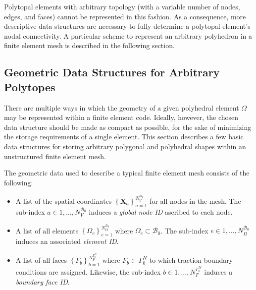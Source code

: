 	Polytopal elements with arbitrary topology (with a variable number of nodes, edges, and faces) cannot be represented in this fashion. As a consequence, more descriptive data structures are necessary to fully determine a polytopal element's nodal connectivity. A particular scheme to represent an arbitrary polyhedron in a finite element mesh is described in the following section.

\subsection*{Geometric Data Structures for Arbitrary Polytopes}

	There are multiple ways in which the geometry of a given polyhedral element $\Omega$ may be represented within a finite element code. Ideally, however, the chosen data structure should be made as compact as possible, for the sake of minimizing the storage requirements of a single element. This section describes a few basic data structures for storing arbitrary polygonal and polyhedral shapes within an unstructured finite element mesh.
	
	The geometric data used to describe a typical finite element mesh consists of the following:
	\begin{itemize}
		\item A list of the spatial coordinates $\left\{ \mathbf{X}_a \right\}_{a=1}^{N^{\mathcal{B}_0}_V}$ for all nodes in the mesh. The sub-index $a \in 1, \ldots, N^{\mathcal{B}_0}_V$ induces a \textit{global node ID} ascribed to each node.
		\item A list of all elements $\left\{ \Omega_{e} \right\}_{e = 1}^{N^{\mathcal{B}_0}_\Omega}$ where $\Omega_{e} \subset \mathcal{B}_0$. The sub-index $e \in 1, \ldots, N^{\mathcal{B}_0}_\Omega$ induces an associated \textit{element ID}.
		\item A list of all faces $\left\{ F_{b} \right\}_{b = 1}^{N^{\Gamma^N_0}_F}$ where $F_{b} \subset \Gamma^N_0$ to which traction boundary conditions are assigned. Likewise, the sub-index $b \in 1, \ldots, N^{\Gamma^N_0}_F$ induces a \textit{boundary face ID}.
	\end{itemize}
	

